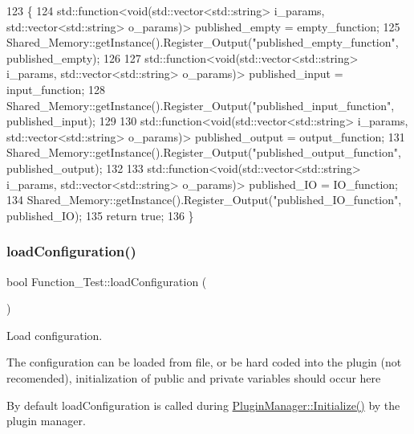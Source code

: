 \begin{DoxyCode}
123 \{
124     std::function<void(std::vector<std::string> i\_params, std::vector<std::string> o\_params)> 
      published\_empty = empty\_function;
125     Shared\_Memory::getInstance().Register\_Output(\textcolor{stringliteral}{"published\_empty\_function"}, published\_empty);
126     
127     std::function<void(std::vector<std::string> i\_params, std::vector<std::string> o\_params)> 
      published\_input = input\_function;
128     Shared\_Memory::getInstance().Register\_Output(\textcolor{stringliteral}{"published\_input\_function"}, published\_input);
129     
130     std::function<void(std::vector<std::string> i\_params, std::vector<std::string> o\_params)> 
      published\_output = output\_function;
131     Shared\_Memory::getInstance().Register\_Output(\textcolor{stringliteral}{"published\_output\_function"}, published\_output);
132     
133     std::function<void(std::vector<std::string> i\_params, std::vector<std::string> o\_params)> published\_IO 
      = IO\_function;
134     Shared\_Memory::getInstance().Register\_Output(\textcolor{stringliteral}{"published\_IO\_function"}, published\_IO);
135     \textcolor{keywordflow}{return} \textcolor{keyword}{true};
136 \}
\end{DoxyCode}
\mbox{\label{class_function___test_ab2f00495eb55e7edf061498dcf7aaa4f}} 
\subsubsection{\texorpdfstring{load\+Configuration()}{loadConfiguration()}}
{\footnotesize\ttfamily bool Function\+\_\+\+Test\+::load\+Configuration (\begin{DoxyParamCaption}{ }\end{DoxyParamCaption})\hspace{0.3cm}{\ttfamily [virtual]}}



Load configuration. 

The configuration can be loaded from file, or be hard coded into the plugin (not recomended), initialization of public and private variables should occur here

By default load\+Configuration is called during \hyperlink{class_plugin_manager_a956e653b7db36da9d034b4a93c8308d5}{Plugin\+Manager\+::\+Initialize()} by the plugin manager.

